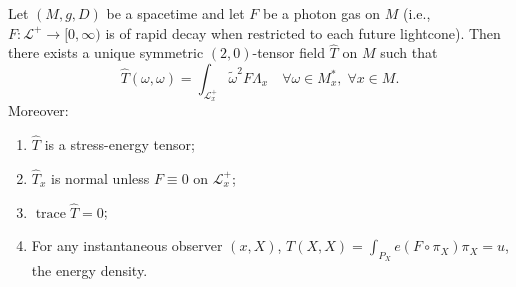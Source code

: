 Let $(M, g, D)$ be a spacetime and let $F$ be a photon gas on $M$ (i.e., $F: \mathcal{L}^+ \to [0, \infty)$ is of rapid decay when restricted to each future lightcone). Then there exists a unique symmetric $(2, 0)$-tensor field $\hat{T}$ on $M$ such that
$$\hat{T}(\omega, \omega) = \int_{\mathcal{L}_x^+} \tilde{\omega}^2 F \Lambda_x \quad \forall \omega \in M_x^*, \; \forall x \in M.$$
Moreover:
\begin{enumerate}
    \item[(a)] $\hat{T}$ is a stress-energy tensor;
    \item[(b)] $\hat{T}_x$ is normal unless $F \equiv 0$ on $\mathcal{L}_x^+$;
    \item[(c)] $\operatorname{trace} \hat{T} = 0$;
    \item[(d)] For any instantaneous observer $(x, X)$, $T(X, X) = \int_{P_X} e (F \circ \pi_X) \pi_X = u$, the energy density.
\end{enumerate}
